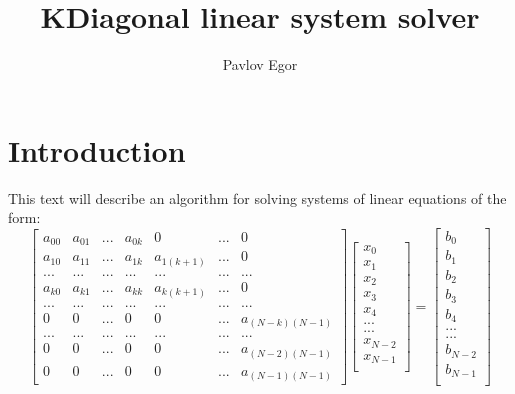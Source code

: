 \documentclass{article}
\title{KDiagonal linear system solver}
\author{Pavlov Egor}
\begin{document}
\maketitle


\section{Introduction}
This text will describe an algorithm for solving systems of linear equations of the form:
\begin{equation}
\begin{bmatrix}
a_{00} & a_{01} & ... & a_{0k} & 0 &... & 0 \\
a_{10} & a_{11} & ... & a_{1k} & a_{1 (k+1)} &... & 0 \\
... & ... & ... & ... & ... &... & ... \\
a_{k0} & a_{k1} & ... & a_{kk} & a_{k(k+1)} &... & 0 \\
... & ... & ... & ... & ... &... & ... \\
0 & 0 & ... & 0 & 0 &... & a_{(N-k)(N-1)} \\
... & ... & ... & ... & ... &... & ... \\
0 & 0 & ... & 0 & 0 &... & a_{(N-2)(N-1)} \\
0 & 0 & ... & 0 & 0 &... & a_{(N-1)(N-1)}
\end{bmatrix} \begin{bmatrix}
x_0 \\
x_1 \\
x_2 \\
x_3 \\
x_4 \\
... \\
... \\
x_{N-2} \\
x_{N-1} \\
\end{bmatrix} = \begin{bmatrix}
b_0 \\
b_1 \\
b_2 \\
b_3 \\
b_4 \\
... \\
... \\
b_{N-2} \\
b_{N-1} \\ 
\end{bmatrix} 
\end{equation}
\end{document}
